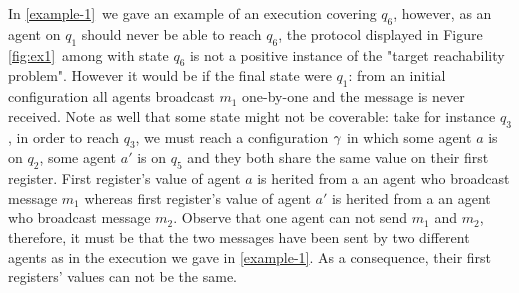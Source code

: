 \begin{example}
	In \cref{example-1}~we gave an example of an execution covering $q_6$, however, as an agent on $q_1$ should never be able to reach $q_6$, the protocol displayed in Figure \ref{fig:ex1}~among with state $q_6$ is not a positive instance of the "target reachability problem". However it would be if the final state were $q_1$: from an initial configuration all agents broadcast $m_1$ one-by-one and the message is never received. Note as well that some state might not be coverable: take for instance $q_3$, in order to reach $q_3$, we must reach a configuration $\gamma$ in which some agent $a$ is on $q_2$, some agent $a'$ is on $q_5$ and they both share the same value on their first register. First register's value of agent $a$ is herited from a an agent who broadcast message $m_1$ whereas first register's value of agent $a'$ is herited from a an agent who broadcast message $m_2$. Observe that one agent can not send $m_1$ and $m_2$, therefore, it must be that the two messages have been sent by two different agents as in the execution we gave in \cref{example-1}. As a consequence, their first registers' values can not be the same.
\end{example}

